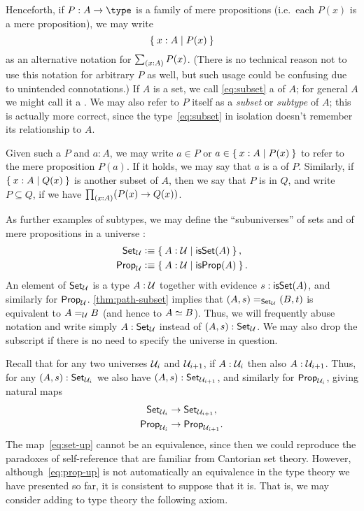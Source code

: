 \label{defn:setof}%
Henceforth, if $P:A\to \type$ is a family of mere propositions (i.e.\ each $P(x)$ is a mere proposition), we may write
%
\begin{equation}
  \label{eq:subset}
  \setof{x:A | P(x)}
\end{equation}
%
as an alternative notation for $\sm{x:A} P(x)$.
(There is no technical reason not to use this notation for arbitrary $P$ as well, but such usage could be confusing due to unintended connotations.)
If $A$ is a set, we call \eqref{eq:subset} a 
%
%
of $A$; for general $A$ we might call it a .
%
We may also refer to $P$ itself as a \emph{subset} or \emph{subtype} of $A$; this is actually more correct, since the type~\eqref{eq:subset} in isolation doesn't remember its relationship to $A$.

Given such a $P$ and $a:A$, we may write $a\in P$ or $a\in \setof{x:A | P(x)}$ to refer to the mere proposition $P(a)$.
If it holds, we may say that $a$ is a  of $P$.
Similarly, if $\setof{x:A | Q(x)}$ is another subset of $A$, then we say that $P$ is 
%
%
in $Q$, and write $P\subseteq Q$, if we have $\prd{x:A}(P(x)\rightarrow Q(x))$.

As further examples of subtypes, we may define the ``subuniverses'' of sets and of mere propositions in a universe \UU:
\begin{align*}
  \setU &\defeq \setof{A:\UU | \isset(A) },\\
  \propU &\defeq \setof{A:\UU | \isprop(A) }.
\end{align*}
An element of $\setU$ is a type $A:\UU$ together with evidence $s:\isset(A)$, and similarly for $\propU$.
\autoref{thm:path-subset} implies that $\id[\setU]{(A,s)}{(B,t)}$ is equivalent to $\id[\UU]AB$ (and hence to $\eqv AB$).
Thus, we will frequently abuse notation and write simply $A:\setU$ instead of $(A,s):\setU$.
We may also drop the subscript \UU if there is no need to specify the universe in question.

Recall that for any two universes $\UU_i$ and $\UU_{i+1}$, if $A:\UU_i$ then also $A:\UU_{i+1}$.
Thus, for any $(A,s):\set_{\UU_i}$ we also have $(A,s):\set_{\UU_{i+1}}$, and similarly for $\prop_{\UU_i}$, giving natural maps
\begin{align}
  \set_{\UU_i} &\to \set_{\UU_{i+1}}\label{eq:set-up},\\
  \prop_{\UU_i} &\to \prop_{\UU_{i+1}}.\label{eq:prop-up}
\end{align}
The map~\eqref{eq:set-up} cannot be an equivalence, since then we could reproduce the paradoxes of self-reference that are familiar from Cantorian set theory.
However, although~\eqref{eq:prop-up} is not automatically an equivalence in the type theory we have presented so far, it is consistent to suppose that it is.
That is, we may consider adding to type theory the following axiom.


